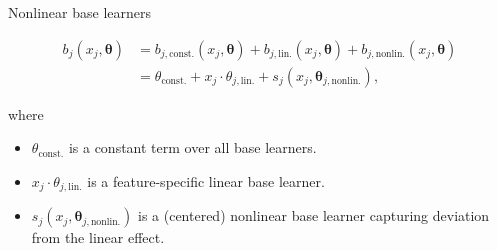\begin{vbframe}{Nonlinear base learners}
\vspace{-0.5cm}

\begin{align*}
b_j(x_j, \pmb\theta) & = b_{j,\text{const.}}(x_j, \pmb\theta) + b_{j,\text{lin.}}(x_j, \pmb\theta) + b_{j,\text{nonlin.}}(x_j, \pmb\theta)\\
 & = \theta_\text{const.} + x_j\cdot\theta_{j,\text{lin.}} + s_j(x_j, \pmb\theta_{j,\text{nonlin.}}),
\end{align*}

where
\begin{itemize}
  \item $\theta_\text{const.}$ is a constant term over all base learners.
  \item $x_j\cdot\theta_{j,\text{lin.}}$ is a feature-specific linear base learner.
  \item $s_j(x_j, \pmb\theta_{j,\text{nonlin.}})$ is a (centered) nonlinear base learner capturing deviation from the linear effect.
\end{itemize}

\end{vbframe}

